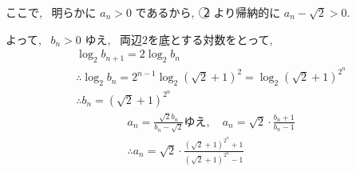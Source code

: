 \documentclass[dvipdfmx]{jsarticle} %
\begin{document}
ここで, \ 明らかに $a_n>0$ であるから, \ \textcircled{\scriptsize 2} より帰納的に $a_n-\sqrt{2}>0$.

よって, \ $b_n > 0$ ゆえ, \ 両辺$2$を底とする対数をとって,
$$
\begin{aligned}
& \log _2 b_{n+1} =2 \log _2 b_n \\
& \therefore \log _2 b_n 
= 2^{n-1} \log _2(\sqrt{2}+1)^2=\log _2(\sqrt{2}+1)^{2^n} \\
& \therefore b_n=(\sqrt{2}+1)^{2^n}
\end{aligned}
$$
$$
\begin{aligned}
& a_n=\frac{\sqrt{2} b_n}{b_n-\sqrt{2}} ゆえ, \quad a_n=\sqrt{2} \cdot \frac{b_n+1}{b_n-1} \\
& \therefore a_n=\sqrt{2} \cdot \frac{(\sqrt{2}+1)^{2^n}+1}{(\sqrt{2}+1)^{2^n}-1}
\end{aligned}
$$
\end{document}
